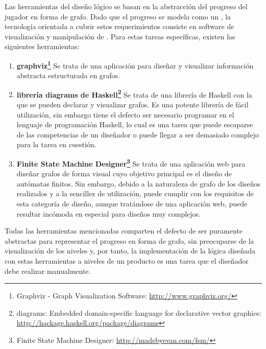 Las herramientas del diseño lógico se basan en la abstracción del progreso del jugador en forma de grafo.
Dado que el progreso se modela como un , la tecnología orientada a cubrir estos requerimientos consiste en software de visualización y manipulación de . Para estas tareas específicas, existen las siguientes herramientas:
\begin{enumerate}
	\item \textbf{graphviz\footnote{Graphviz - Graph Visualization Software: \url{http://www.graphviz.org/}}} Se trata de una aplicación para diseñar y visualizar información abstracta estructurada en grafos.
	\item \textbf{librería diagrams de Haskell\footnote{diagrams: Embedded domain-specific language for declarative vector graphics: \url{http://hackage.haskell.org/package/diagrams}}} Se trata de una librería de Haskell con la que se pueden declarar y visualizar grafos. Es una potente librería de fácil utilización, sin embargo tiene el defecto ser necesario programar en el lenguaje de programación Haskell, lo cual es una tarea que puede escaparse de las competencias de un diseñador o puede llegar a ser demasiado complejo para la tarea en cuestión.
	\item \textbf{Finite State Machine Designer\footnote{Finite State Machine Designer: \url{http://madebyevan.com/fsm/}}} Se trata de una aplicación web para diseñar grafos de forma visual cuyo objetivo principal es el diseño de autómatas finitos. Sin embargo, debido a la naturaleza de grafo de los diseños realizados y a la sencillez de utilización, puede cumplir con los requisitos de esta categoría de diseño, aunque tratándose de una aplicación web, puede resultar incómoda en especial para diseños muy complejos.
\end{enumerate}
Todas las herramientas mencionadas comparten el defecto de ser puramente abstractas para representar el progreso en forma de grafo, sin preocuparse de la visualización de los niveles y, por tanto, la implementación de la lógica diseñada con estas herramientas a niveles de un producto es una tarea que el diseñador debe realizar manualmente.